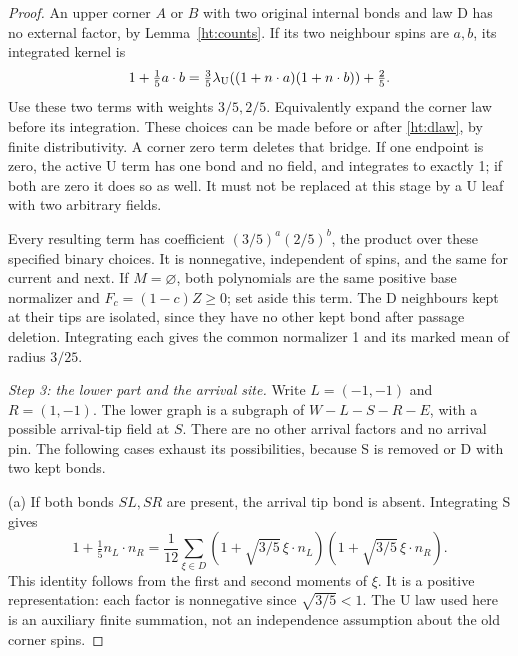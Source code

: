 \begin{proof}
An upper corner \(A\) or \(B\) with two original internal bonds and
law D has no external factor, by Lemma~\ref{ht:counts}. If its two
neighbour spins are \(a,b\), its integrated kernel is
\begin{equation}\label{ht:topd}
 1+\tfrac15a\cdot b
   =\tfrac35\lambda_{\mathrm U}((1+n\cdot a)(1+n\cdot b))
       +\tfrac25.
\end{equation}
Use these two terms with weights \(3/5,2/5\). Equivalently expand the
corner law before its integration. These choices can be made before or
after \eqref{ht:dlaw}, by finite distributivity. A corner zero term
deletes that bridge. If one endpoint is zero, the active U term has
one bond and no field, and integrates to exactly 1; if both are zero
it does so as well. It must not be replaced at this stage by a U leaf
with two arbitrary fields.

Every resulting term has coefficient
\((3/5)^a(2/5)^b\), the product over these specified binary choices.
It is nonnegative, independent of spins, and the same for current and
next. If \(M=\varnothing\), both polynomials are the same positive
base normalizer and \(F_c=(1-c)Z\ge0\); set aside this term.
The D neighbours kept at their tips are isolated, since they have no
other kept bond after passage deletion. Integrating each gives the
common normalizer 1 and its marked mean of radius \(3/25\).

\emph{Step 3: the lower part and the arrival site.}
Write \(L=(-1,-1)\) and \(R=(1,-1)\). The lower graph is a subgraph
of \(W-L-S-R-E\), with a possible arrival-tip field at \(S\).
There are no other arrival factors and no arrival pin. The following
cases exhaust its possibilities, because S is removed or D with two
kept bonds.

(a) If both bonds \(SL,SR\) are present, the arrival tip bond is absent.
Integrating S gives
\begin{equation}\label{ht:arrivalcut}
 1+\tfrac15n_L\cdot n_R
   =\frac1{12}\sum_{\xi\in D}
        (1+\sqrt{3/5}\,\xi\cdot n_L)
        (1+\sqrt{3/5}\,\xi\cdot n_R).
\end{equation}
This identity follows from the first and second moments of \(\xi\).
It is a positive representation: each factor is nonnegative since
\(\sqrt{3/5}<1\). The U law used here is an auxiliary finite summation,
not an independence assumption about the old corner spins.


\end{proof}
